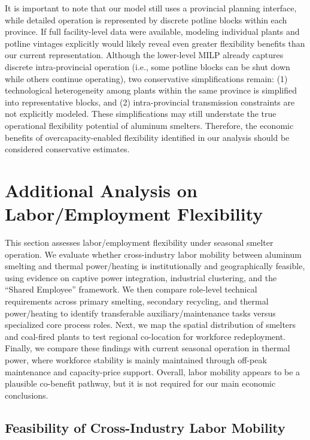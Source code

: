\documentclass[preprint,12pt]{elsarticle}
\begin{document}
It is important to note that our model still uses a provincial planning interface, while detailed operation is represented by discrete potline blocks within each province. If full facility-level data were available, modeling individual plants and potline vintages explicitly would likely reveal even greater flexibility benefits than our current representation. Although the lower-level MILP already captures discrete intra-provincial operation (i.e., some potline blocks can be shut down while others continue operating), two conservative simplifications remain: (1) technological heterogeneity among plants within the same province is simplified into representative blocks, and (2) intra-provincial transmission constraints are not explicitly modeled. These simplifications may still understate the true operational flexibility potential of aluminum smelters. Therefore, the economic benefits of overcapacity-enabled flexibility identified in our analysis should be considered conservative estimates.




\newpage
\section{Additional Analysis on Labor/Employment Flexibility}

This section assesses labor/employment flexibility under seasonal smelter operation. We evaluate whether cross-industry labor mobility between aluminum smelting and thermal power/heating is institutionally and geographically feasible, using evidence on captive power integration, industrial clustering, and the ``Shared Employee'' framework. We then compare role-level technical requirements across primary smelting, secondary recycling, and thermal power/heating to identify transferable auxiliary/maintenance tasks versus specialized core process roles. Next, we map the spatial distribution of smelters and coal-fired plants to test regional co-location for workforce redeployment. Finally, we compare these findings with current seasonal operation in thermal power, where workforce stability is mainly maintained through off-peak maintenance and capacity-price support. Overall, labor mobility appears to be a plausible co-benefit pathway, but it is not required for our main economic conclusions.

\subsection{Feasibility of Cross-Industry Labor Mobility}
\end{document}
